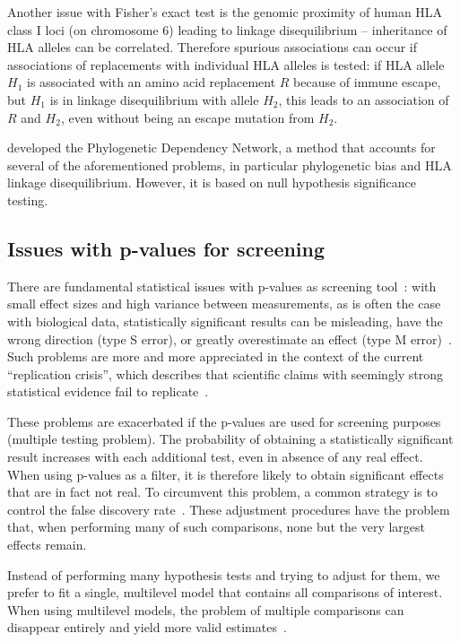 \documentclass{bioinfo}
\begin{document}
Another issue with Fisher's exact test is the genomic proximity of human HLA class I loci (on chromosome 6) leading to linkage disequilibrium -- inheritance of HLA alleles can be correlated. Therefore spurious associations can occur if associations of replacements with individual HLA alleles is tested: if HLA allele \(H_1\) is associated with an amino acid replacement \(R\) because of immune escape, but \(H_1\) is in linkage disequilibrium with allele \(H_2\), this leads to an association of \(R\) and \(H_2\), even without being an escape mutation from $H_2$.

\citet{Carlson2008} developed the Phylogenetic Dependency Network, a method that accounts for several of the aforementioned problems, in particular phylogenetic bias and  HLA linkage disequilibrium. However, it is based on null hypothesis significance testing.

\subsection{Issues with p-values for screening}

There are fundamental statistical issues with p-values as screening tool~\citep{Amrhein2017}:
with small effect sizes and high variance between measurements, as is often the case with biological data, statistically significant results can be misleading, have the wrong direction (type S error), or greatly overestimate an effect (type M error)~\citep{Gelman2014}. Such problems are more and more appreciated in the context of the current ``replication crisis'', which describes that scientific claims with seemingly strong statistical evidence fail to replicate~\citep{Ioannidis2005, Begley:2012, Baker2016Nature-reproducibility-crisis}.

These problems are exacerbated if the p-values are used for screening purposes (multiple testing problem). The probability  of  obtaining a statistically significant result increases with each additional test, even in absence of any real effect. When using p-values as a filter, it is therefore likely to obtain significant effects that are in fact not real. To circumvent this problem, a common strategy is to control the false discovery rate~\citep{Benjamini1995}. These adjustment procedures have the problem that, when performing many of such comparisons, none but the very largest effects remain.

Instead of performing many hypothesis tests and trying to adjust for them, we prefer to fit a single, multilevel model that contains all comparisons of interest. When using multilevel models, the problem of multiple comparisons can disappear entirely and yield more valid estimates~\citep{Gelman2012}.
\end{document}

